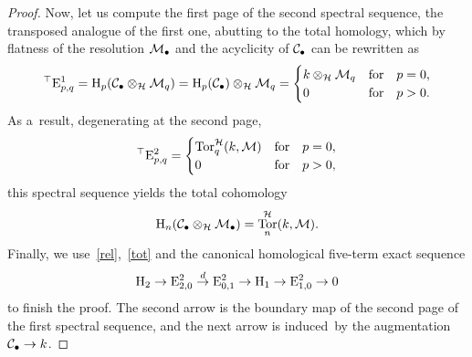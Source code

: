 \documentclass[pdftex]{sigma}
\numberwithin{equation}{section}
\DeclareMathOperator{\Tor}{Tor}
\begin{document}
\begin{proof}
Now, let us compute the f\/irst page of the second spectral sequence, the transposed analogue of the f\/irst one, abutting
to the total homology, which by f\/latness of the resolution ${\cal M}_{\bullet}$ and the acyclicity of ${\cal
C}_{\bullet}$ can be rewritten as
\begin{gather*}
^{\top }{\rm E}^1_{p,q}={\rm H}_{p}({\cal C}_{\bullet}\otimes_{{\cal H}}{\cal M}_{q})={\rm H}_{p}({\cal
C}_{\bullet})\otimes_{{\cal H}}{\cal M}_{q}=\begin{cases}
k\otimes_{{\cal H}}{\cal M}_{q}& \text{for}\quad  p=0,
\\
0 & \text{for}\quad  p>0.
\end{cases}
\end{gather*}
As a~result, degenerating at the second page,
\begin{gather*}
^{\top }{\rm E}^2_{p,q}=\begin{cases}
\Tor^{{\cal H}}_{q}(k,{\cal M})& \text{for}\quad  p=0,
\\
0 & \text{for}\quad  p>0,
\end{cases}
\end{gather*}
this spectral sequence yields the total cohomology
\begin{gather}
\label{tot}
{\rm H}_{n}({\cal C}_{\bullet}\otimes_{{\cal H}}{\cal M}_{\bullet})=\Tor^{{\cal H}}_{n}(k,{\cal M}).
\end{gather}
Finally, we use~\eqref{rel},~\eqref{tot} and the canonical homological f\/ive-term exact sequence
\begin{gather*}
{\rm H}_2\rightarrow {\rm E}^2_{2,0}\stackrel{d}{\rightarrow} {\rm E}^2_{0,1}\rightarrow {\rm H}_1\rightarrow {\rm
E}^2_{1,0}\rightarrow 0
\end{gather*}
to f\/inish the proof.
The second arrow is the boundary map of the second page of the f\/irst spectral sequence, and the next arrow is induced~by
the augmentation ${\cal C}_{\bullet}\rightarrow k$.
\end{proof}
\end{document}
